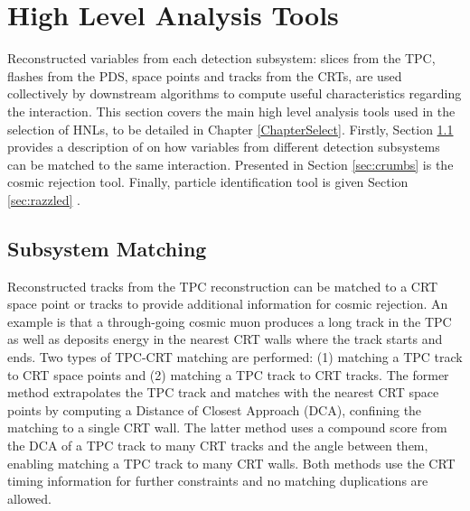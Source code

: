 
\section{High Level Analysis Tools}
\label{sec:reco_ana_tools}

Reconstructed variables from each detection subsystem: slices from the TPC, flashes from the PDS, space points and tracks from the CRTs, are used collectively by downstream algorithms to compute useful characteristics regarding the interaction.
This section covers the main high level analysis tools used in the selection of HNLs, to be detailed in Chapter \ref{ChapterSelect}.
Firstly, Section \ref{sec:subsystem_match} provides a description of on how variables from different detection subsystems can be matched to the same interaction.
Presented in Section \ref{sec:crumbs} is the cosmic rejection tool.
Finally, particle identification tool is given Section \ref{sec:razzled} .

\subsection{Subsystem Matching}
\label{sec:subsystem_match}


Reconstructed tracks from the TPC reconstruction can be matched to a CRT space point or tracks to provide additional information for cosmic rejection.
An example is that a through-going cosmic muon produces a long track in the TPC as well as deposits energy in the nearest CRT walls where the track starts and ends. 
Two types of TPC-CRT matching are performed: (1) matching a TPC track to CRT space points and (2) matching a TPC track to CRT tracks.
The former method extrapolates the TPC track and matches with the nearest CRT space points by computing a Distance of Closest Approach (DCA), confining the matching to a single CRT wall. 
The latter method uses a compound score from the DCA of a TPC track to many CRT tracks and the angle between them, enabling matching a TPC track to many CRT walls.
Both methods use the CRT timing information for further constraints and no matching duplications are allowed.

